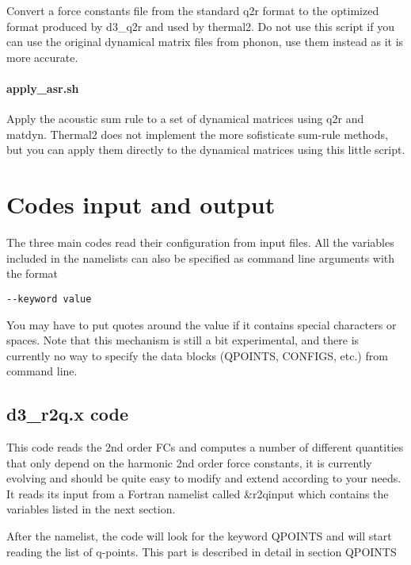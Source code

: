 \documentclass[
]{article}
\begin{document}
Convert a force constants file from the standard q2r format to the
optimized format produced by d3\_q2r and used by thermal2. Do not use
this script if you can use the original dynamical matrix files from
phonon, use them instead as it is more accurate.

\hypertarget{apply_asr.sh-1}{%
\paragraph{apply\_asr.sh}\label{apply_asr.sh-1}}

Apply the acoustic sum rule to a set of dynamical matrices using q2r and
matdyn. Thermal2 does not implement the more sofisticate sum-rule
methods, but you can apply them directly to the dynamical matrices using
this little script.

\hypertarget{codes-input-and-output}{%
\section{Codes input and output}\label{codes-input-and-output}}

The three main codes read their configuration from input files. All the
variables included in the namelists can also be specified as command
line arguments with the format

\begin{verbatim}
--keyword value
\end{verbatim}

You may have to put quotes around the value if it contains special
characters or spaces. Note that this mechanism is still a bit
experimental, and there is currently no way to specify the data blocks
(QPOINTS, CONFIGS, etc.) from command line.

\hypertarget{d3_r2q.x-code}{%
\subsection{d3\_r2q.x code}\label{d3_r2q.x-code}}

This code reads the 2nd order FCs and computes a number of different
quantities that only depend on the harmonic 2nd order force constants,
it is currently evolving and should be quite easy to modify and extend
according to your needs. It reads its input from a Fortran namelist
called \&r2qinput which contains the variables listed in the next
section.

After the namelist, the code will look for the keyword QPOINTS and will
start reading the list of q-points. This part is described in detail in
section QPOINTS
\end{document}
